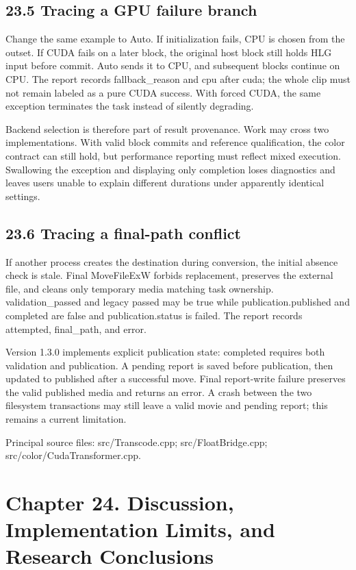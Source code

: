 \documentclass[11pt,a4paper,openany]{book}
\begin{document}
\section*{23.5 Tracing a GPU failure branch}
Change the same example to Auto. If initialization fails, CPU is chosen from the outset. If CUDA fails on a later block, the original host block still holds HLG input before commit. Auto sends it to CPU, and subsequent blocks continue on CPU. The report records fallback\_reason and cpu after cuda; the whole clip must not remain labeled as a pure CUDA success. With forced CUDA, the same exception terminates the task instead of silently degrading.

Backend selection is therefore part of result provenance. Work may cross two implementations. With valid block commits and reference qualification, the color contract can still hold, but performance reporting must reflect mixed execution. Swallowing the exception and displaying only completion loses diagnostics and leaves users unable to explain different durations under apparently identical settings.


\section*{23.6 Tracing a final-path conflict}
If another process creates the destination during conversion, the initial absence check is stale. Final MoveFileExW forbids replacement, preserves the external file, and cleans only temporary media matching task ownership. validation\_passed and legacy passed may be true while publication.published and completed are false and publication.status is failed. The report records attempted, final\_path, and error.

Version 1.3.0 implements explicit publication state: completed requires both validation and publication. A pending report is saved before publication, then updated to published after a successful move. Final report-write failure preserves the valid published media and returns an error. A crash between the two filesystem transactions may still leave a valid movie and pending report; this remains a current limitation.


\par\small Principal source files: src/Transcode.cpp; src/FloatBridge.cpp; src/color/CudaTransformer.cpp.\normalsize

\chapter*{Chapter 24. Discussion, Implementation Limits, and Research Conclusions}
\end{document}
